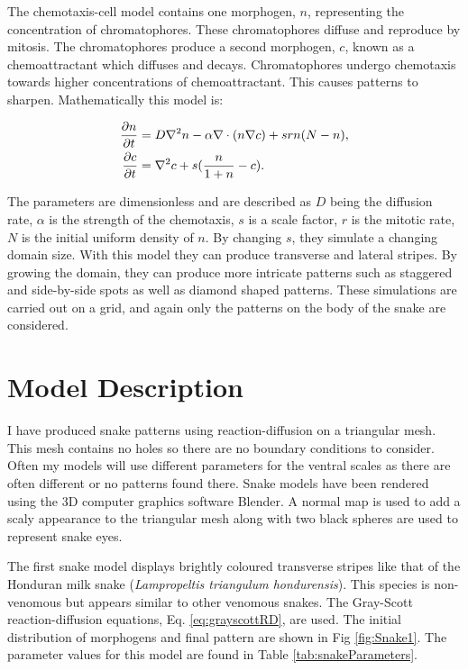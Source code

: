 The chemotaxis-cell model contains one morphogen, $n$, representing the concentration of chromatophores. These chromatophores diffuse and reproduce by mitosis. The chromatophores produce a second morphogen, $c$, known as a chemoattractant which diffuses and decays. Chromatophores undergo chemotaxis towards higher concentrations of chemoattractant. This  causes patterns to sharpen. Mathematically this model is:

\begin{equation}
\begin{aligned} \label{eq:chemotaxis}
  \frac{\partial n}{\partial t} &= D \nabla^2{} n - \alpha \nabla \cdot{} (n\nabla{}c) + srn(N-n), \\
  \frac{\partial c}{\partial t} &= \nabla^2{} c + s(\frac{n}{1+n}-c).
\end{aligned}
\end{equation}

The parameters are dimensionless and are described as $D$ being the diffusion rate, $\alpha$ is the strength of the chemotaxis, $s$ is a scale factor, $r$ is the mitotic rate, $N$ is the initial uniform density of $n$. By changing $s$, they simulate a changing domain size. With this model they can produce transverse and lateral stripes. By growing the domain, they can produce more intricate patterns such as staggered and side-by-side spots as well as diamond shaped patterns. These simulations are carried out on a grid, and again only the patterns on the body of the snake are considered.

\newpage

\section{Model Description}
I have produced snake patterns using reaction-diffusion on a triangular mesh. This mesh contains no holes so there are no boundary conditions to consider. Often my models will use different parameters for the ventral scales as there are often different or no patterns found there. Snake models have been rendered using the 3D computer graphics software Blender. A normal map is used to add a scaly appearance to the triangular mesh along with two black spheres are used to represent snake eyes.

The first snake model displays brightly coloured transverse stripes like that of the Honduran milk snake (\textit{Lampropeltis triangulum hondurensis}). This species is non-venomous but appears similar to other venomous snakes. The Gray-Scott reaction-diffusion equations, Eq. \ref{eq:grayscottRD}, are used. The initial distribution of morphogens and final pattern are shown in Fig \ref{fig:Snake1}. The parameter values for this model are found in Table \ref{tab:snakeParameters}.


